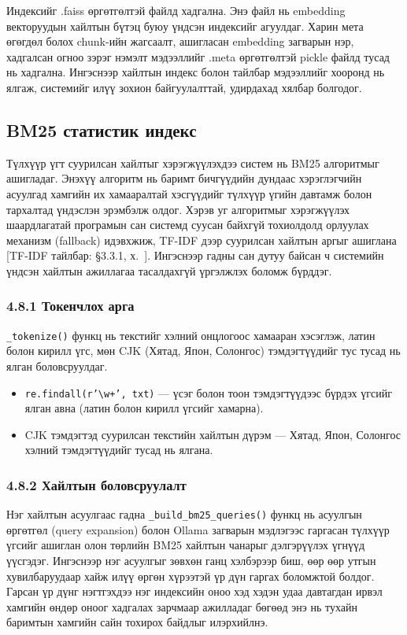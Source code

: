 \documentclass[11pt,a4paper]{article}
\begin{document}
Индексийг .faiss өргөтгөлтэй файлд хадгална. Энэ файл нь embedding векторуудын хайлтын бүтэц буюу үндсэн индексийг агуулдаг. Харин мета өгөгдөл болох chunk-ийн жагсаалт, ашигласан embedding загварын нэр, хадгалсан огноо зэрэг нэмэлт мэдээллийг .meta өргөтгөлтэй pickle файлд тусад нь хадгална. Ингэснээр хайлтын индекс болон тайлбар мэдээллийг хооронд нь ялгаж, системийг илүү зохион байгуулалттай, удирдахад хялбар болгодог.
\subsection{BM25 статистик индекс}

Түлхүүр үгт суурилсан хайлтыг хэрэгжүүлэхдээ систем нь BM25 алгоритмыг ашигладаг. Энэхүү алгоритм нь баримт бичгүүдийн дундаас хэрэглэгчийн асуулгад хамгийн их хамааралтай хэсгүүдийг түлхүүр үгийн давтамж болон тархалтад үндэслэн эрэмбэлж олдог. Хэрэв уг алгоритмыг хэрэгжүүлэх шаардлагатай програмын сан системд суусан байхгүй тохиолдолд орлуулах механизм (fallback) идэвхжиж, TF-IDF дээр суурилсан хайлтын аргыг ашиглана [TF-IDF тайлбар: §3.3.1, х.~\pageref{sec:tfidf-explained}]. Ингэснээр гадны сан дутуу байсан ч системийн үндсэн хайлтын ажиллагаа тасалдахгүй үргэлжлэх боломж бүрддэг.
\subsubsection*{4.8.1 Токенчлох арга}

\texttt{\_tokenize()} функц нь текстийг хэлний онцлогоос хамааран хэсэглэж, латин болон кирилл үгс, мөн CJK (Хятад, Япон, Солонгос) тэмдэгтүүдийг тус тусад нь ялган боловсруулдаг.

\begin{itemize}
    \item \texttt{re.findall(r'\textbackslash w+', txt)} --- үсэг болон тоон тэмдэгтүүдээс бүрдэх үгсийг ялган авна (латин болон кирилл үгсийг хамарна).
    \item CJK тэмдэгтэд суурилсан текстийн хайлтын дүрэм --- Хятад, Япон, Солонгос хэлний тэмдэгтүүдийг тусад нь ялгана.
\end{itemize}

\subsubsection*{4.8.2 Хайлтын боловсруулалт}

Нэг хайлтын асуулгаас гадна \texttt{\_build\_bm25\_queries()} функц нь асуулгын өргөтгөл (query expansion) болон Ollama загварын мэдлэгээс гаргасан түлхүүр үгсийг ашиглан олон төрлийн BM25 хайлтын чанарыг дэлгэрүүлэх үгнүүд үүсгэдэг. Ингэснээр нэг асуулгыг зөвхөн ганц хэлбэрээр биш, өөр өөр утгын хувилбаруудаар хайж илүү өргөн хүрээтэй үр дүн гаргах боломжтой болдог. Гарсан үр дүнг нэгтгэхдээ нэг индексийн оноо хэд хэдэн удаа давтагдан ирвэл хамгийн өндөр оноог хадгалах зарчмаар ажилладаг бөгөөд энэ нь тухайн баримтын хамгийн сайн тохирох байдлыг илэрхийлнэ. 
\end{document}
